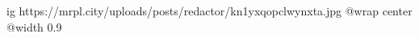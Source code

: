  
 
 
 
 

\ifcmt
  ig https://mrpl.city/uploads/posts/redactor/kn1yxqopclwynxta.jpg
  @wrap center
  @width 0.9
\fi
